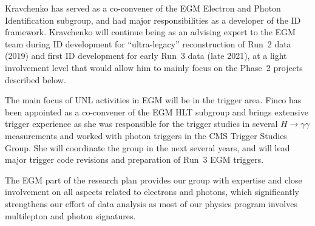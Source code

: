 Kravchenko has served as a co-convener of the EGM Electron and Photon Identification subgroup, and had major responsibilities as a developer of the ID framework. 
Kravchenko will continue being as an advising expert to the EGM team during ID development for ``ultra-legacy'' reconstruction of Run~2 data (2019) and first ID development for early Run~3 data (late 2021), at a light involvement level that would allow him to mainly focus on the Phase~2 projects described below.


The main focus of UNL activities in EGM will be in the trigger area. Finco has been appointed as a co-convener of the EGM HLT subgroup and brings extensive trigger experience as she was responsible for the trigger studies in several $H\to\gamma\gamma$ measurements and worked with photon triggers in the CMS Trigger Studies Group. She will coordinate the group in the next several years, and will lead major trigger code revisions and preparation of Run~3 EGM triggers.

The EGM part of the research plan provides our group with expertise and close involvement on all aspects related to electrons and photons, which significantly strengthens our effort of data analysis as most of our physics program involves multilepton and photon signatures.

